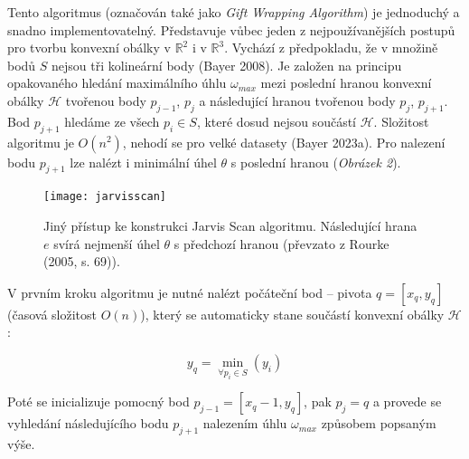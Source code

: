 \par Tento algoritmus (označován také jako \emph{Gift Wrapping Algorithm}) je jednoduchý a snadno implementovatelný. Představuje vůbec jeden z nejpoužívanějších postupů pro tvorbu konvexní obálky v $\mathbb{R}^2$ i v $\mathbb{R}^3$. Vychází z předpokladu, že v množině bodů $S$ nejsou tři kolineární body (Bayer 2008). Je založen na principu opakovaného hledání maximálního úhlu $\omega_{max}$ mezi poslední hranou konvexní obálky $\mathcal{H}$ tvořenou body $p_{j-1}$, $p_j$ a následující hranou tvořenou body $p_j$, $p_{j+1}$. Bod $p_{j+1}$ hledáme ze všech $p_i \in S$, které dosud nejsou součástí $\mathcal{H}$. Složitost algoritmu je $O(n^2)$, nehodí se pro velké datasety (Bayer 2023a). Pro nalezení bodu $p_{j+1}$ lze nalézt i minimální úhel $\theta$ s poslední hranou (\emph{Obrázek 2}).

\begin{figure}[h]
\centering
\texttt{[image: jarvisscan]} 
    \caption{Jiný přístup ke konstrukci Jarvis Scan algoritmu. Následující hrana $e$ svírá nejmenší úhel $\theta$ s předchozí hranou (převzato z Rourke (2005, s. 69)).}
\end{figure}

\newpage

\par V prvním kroku algoritmu je nutné nalézt počáteční bod – pivota $q = [x_q, y_q]$ (časová složitost $O(n)$), který se automaticky stane součástí konvexní obálky $\mathcal{H}$:

\begin{equation*}
y_q = \underset{\forall p_i \in S}{\min}(y_i)
\end{equation*}

\par Poté se inicializuje pomocný bod $p_{j-1} = [x_{q}-1, y_q]$, pak $p_j = q$ a provede se vyhledání následujícího bodu $p_{j+1}$ nalezením úhlu $\omega_{max}$ způsobem popsaným výše.

